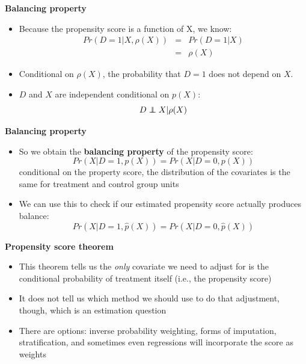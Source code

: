 \documentclass[notes=show]{beamer}
\newcommand\independent{\protect\mathpalette{\protect\independenT}{\perp}}
\def\independenT#1#2{\mathrel{\rlap{$#1#2$}\mkern2mu{#1#2}}}
\begin{document}
\begin{frame}[plain]
	\begin{center}
	\textbf{Balancing property}
	\end{center}
	
	\begin{itemize}
	\item Because the propensity score is a function of X, we know:
		\begin{eqnarray*}
		Pr(D=1 | X,\rho(X)) &=& Pr(D=1|X)\\
		&=& \rho(X)
		\end{eqnarray*}
	\item Conditional on $\rho(X)$, the probability that $D=1$ does not depend on $X$.  
	\item $D$ and $X$ are independent conditional on $p(X)$: $$D\independent{X} | \rho(X)$$
	\end{itemize}
\end{frame}


\begin{frame}[plain]
\begin{center}
\textbf{Balancing property}
\end{center}

\begin{itemize}
	\item So we obtain the \textbf{balancing property} of the propensity score: $$Pr(X|D=1,p(X)) = Pr(X|D=0, p(X))$$ conditional on the property score, the distribution of the covariates is the same for treatment and control group units
	\item We can use this to check if our estimated propensity score actually produces balance:$$Pr(X|D=1,\widehat{p}(X)) = Pr(X|D=0, \widehat{p}(X))$$
\end{itemize}

\end{frame}


\begin{frame}[plain]
	\begin{center}
	\textbf{Propensity score theorem}
	\end{center}
	
	\begin{itemize}
	\item This theorem tells us the \emph{only} covariate we need to adjust for is the conditional probability of treatment itself (i.e., the propensity score)
	\item It does not tell us which method we should use to do that adjustment, though, which is an estimation question
	\item There are options: inverse probability weighting, forms of imputation, stratification, and sometimes even regressions will incorporate the score as weights
	\end{itemize}
\end{frame}
\end{document}
